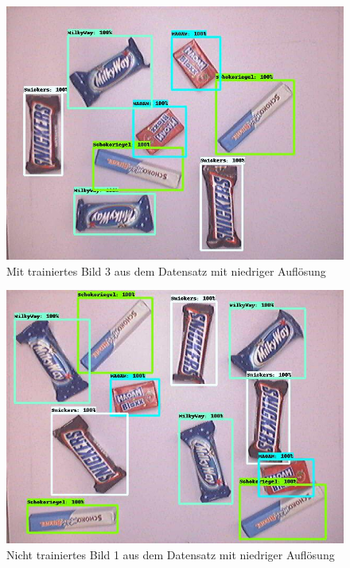     \begin{figure}[H]
        \centering
        \includegraphics[angle = 90, width = \textwidth]{Bilder/models/model_comparison/faster_rcnn_inception_resnet_v2_640x640_coco17_tpu-8/trained_3.jpg}
        \caption{Mit trainiertes Bild 3 aus dem Datensatz mit niedriger Auflösung}
    \end{figure}
    
    \begin{figure}[H]
        \centering
        \includegraphics[angle = 90, width = \textwidth]{Bilder/models/model_comparison/faster_rcnn_inception_resnet_v2_640x640_coco17_tpu-8/non_trained_1.jpg}
        \caption{Nicht trainiertes Bild 1 aus dem Datensatz mit niedriger Auflösung}
    \end{figure}
    
